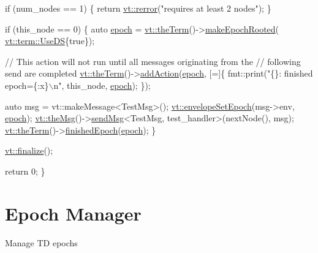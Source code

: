 \begin{DoxyCodeInclude}
  \textcolor{keywordflow}{if} (num\_nodes == 1) \{
    \textcolor{keywordflow}{return} \hyperlink{namespacevt_aff96ace008dc847d4c0f44cfa5dfb3a0}{vt::rerror}(\textcolor{stringliteral}{"requires at least 2 nodes"});
  \}

  \textcolor{keywordflow}{if} (this\_node == 0) \{
    \textcolor{keyword}{auto} \hyperlink{namespacevt_1_1config_a6bd1d6215bda0d8ca02811798399f689a05bdb92281360bcbfdf239ad3ccbde19}{epoch} = \hyperlink{namespacevt_a127580fdfcaba0b4171e5c48c5676733}{vt::theTerm}()->\hyperlink{structvt_1_1term_1_1_termination_detector_a232f305124ecd8f4f62e9c8224a74f49}{makeEpochRooted}(
      \hyperlink{structvt_1_1term_1_1_use_d_s}{vt::term::UseDS}\{\textcolor{keyword}{true}\});

    \textcolor{comment}{// This action will not run until all messages originating from the}
    \textcolor{comment}{// following send are completed}
    \hyperlink{namespacevt_a127580fdfcaba0b4171e5c48c5676733}{vt::theTerm}()->\hyperlink{structvt_1_1term_1_1_term_action_a1227042cb4eb38937fb8ed34bcbdf998}{addAction}(\hyperlink{namespacevt_1_1config_a6bd1d6215bda0d8ca02811798399f689a05bdb92281360bcbfdf239ad3ccbde19}{epoch}, [=]\{
      fmt::print(\textcolor{stringliteral}{"\{\}: finished epoch=\{:x\}\(\backslash\)n"}, this\_node, \hyperlink{namespacevt_1_1config_a6bd1d6215bda0d8ca02811798399f689a05bdb92281360bcbfdf239ad3ccbde19}{epoch});
    \});

    \textcolor{keyword}{auto} msg = vt::makeMessage<TestMsg>();
    \hyperlink{namespacevt_a4a0a9928690206b588dbcac2afb71088}{vt::envelopeSetEpoch}(msg->env, \hyperlink{namespacevt_1_1config_a6bd1d6215bda0d8ca02811798399f689a05bdb92281360bcbfdf239ad3ccbde19}{epoch});
    \hyperlink{namespacevt_aeafd31f866aeb4dc6fc2f6ee97136350}{vt::theMsg}()->\hyperlink{group__preregister_ga0162a39473e7f9b490a79a7983d949ac}{sendMsg}<TestMsg, test\_handler>(nextNode(), msg);
    \hyperlink{namespacevt_a127580fdfcaba0b4171e5c48c5676733}{vt::theTerm}()->\hyperlink{structvt_1_1term_1_1_termination_detector_ad54d75c50bd3f34f30247817737bc303}{finishedEpoch}(\hyperlink{namespacevt_1_1config_a6bd1d6215bda0d8ca02811798399f689a05bdb92281360bcbfdf239ad3ccbde19}{epoch});
  \}

  \hyperlink{namespacevt_a540d90dbd6e97b69f1dcbc9ee9314cff}{vt::finalize}();

  \textcolor{keywordflow}{return} 0;
\}
\end{DoxyCodeInclude}
\hypertarget{epoch}{}\section{Epoch Manager}\label{epoch}
Manage TD epochs

